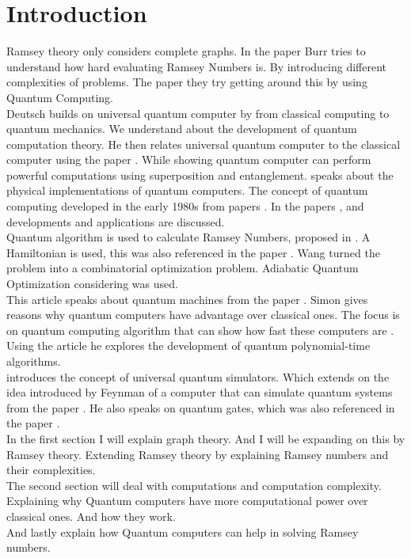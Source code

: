 \documentclass[12pt, a4paper]{Assignment}
\begin{document}
\section*{Introduction}
Ramsey theory only considers complete graphs. 
In the paper \cite{burr1981generalized} Burr tries to understand how hard evaluating Ramsey Numbers is.
By introducing different complexities of problems.
The paper \cite{PhysRevA.93.032301} they try getting around this by using Quantum Computing.
\newline
\\
Deutsch\cite{Deutsch1989} builds on universal quantum computer by \cite{deutsch1985quantum} from classical computing to quantum mechanics. 
We understand about the development of quantum computation theory.
He then relates universal quantum computer to the classical computer using the paper \cite{Turing1936}.
While showing quantum computer can perform powerful computations using superposition and entanglement.
\cite{rietsche2022quantum} speaks about the physical implementations of quantum computers. 
The concept of quantum computing developed in the early 1980s from papers \cite{feynman1982simulating}. 	
In the papers \cite{PhysRevA.93.032301}, \cite{doi:10.1137/S0097539796298637} and \cite{UQS} developments and applications are discussed.
\newline
\\
Quantum algorithm is used to calculate Ramsey Numbers, proposed in \cite{gaitan2012ramsey}.
A Hamiltonian is used, this was also referenced in the paper \cite{doi:10.1137/S0097539796298637}.
Wang turned the problem into a combinatorial optimization problem.
Adiabatic Quantum Optimization considering \cite{farhi2000quantum} was used.
\newline
\\
This article\cite{doi:10.1137/S0097539796298637} speaks about quantum machines from the paper \cite{Deutsch1989}.
Simon gives reasons why quantum computers have advantage over classical ones.
The focus is on quantum computing algorithm that can show how fast these computers are	.
Using the article \cite{shor1994algorithms} he explores the development of quantum polynomial-time algorithms.
\newline
\\
\cite{UQS} introduces the concept of universal quantum simulators. 
Which extends on the idea introduced by Feynman of a computer that can simulate quantum systems from the paper \cite{feynman1982simulating}. 
He also speaks on quantum gates, which was also referenced in the paper \cite{Deutsch1989}.
\newline
\\
In the first section I will explain graph theory.
And I will be expanding on this by Ramsey theory.
Extending Ramsey theory by explaining Ramsey numbers and their complexities.
\\
The second section will deal with computations and computation complexity.
Explaining why Quantum computers have more computational power over classical ones.
And how they work.
\\
And lastly explain how Quantum computers can help in solving Ramsey numbers.
\end{document}
